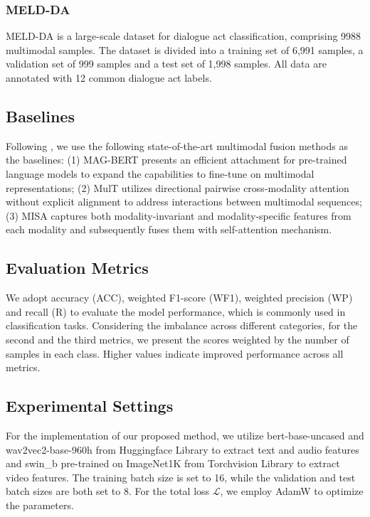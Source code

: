 \documentclass[letterpaper]{article} %
\begin{document}
\subsubsection{MELD-DA}
MELD-DA \cite{saha-etal-2020-towards} is a large-scale dataset for dialogue act classification, comprising 9988 multimodal samples. The dataset is divided into a training set of 6,991 samples, a validation set of 999 samples and a test set of 1,998 samples. All data are annotated with 12 common dialogue act labels.

\subsection{Baselines}
Following \cite{10.1145/3503161.3547906}, we use the following state-of-the-art multimodal fusion methods as the baselines: (1) MAG-BERT \cite{rahman2020integrating} presents an efficient attachment for pre-trained language models to expand the capabilities to fine-tune on multimodal representations; (2) MulT \cite{tsai2019multimodal} utilizes directional pairwise cross-modality attention without explicit alignment to address interactions between multimodal sequences; (3) MISA \cite{10.1145/3394171.3413678} captures both modality-invariant and modality-specific features from each modality and subsequently fuses them with self-attention mechanism.


\subsection{Evaluation Metrics}
We adopt accuracy (ACC), weighted F1-score (WF1), weighted precision (WP) and recall (R) to evaluate the model performance, which is commonly used in classification tasks. Considering the imbalance across different categories, for the second and the third metrics, we present the scores weighted by the number of samples in each class. Higher values indicate improved performance across all metrics.


\subsection{Experimental Settings}
For the implementation of our proposed method, we utilize bert-base-uncased and wav2vec2-base-960h from Huggingface Library \cite{wolf2019huggingface} to extract text and audio features and swin\_b pre-trained on ImageNet1K \cite{5206848} from Torchvision Library \cite{torchvision2016} to extract video features. The training batch size is set to 16, while the validation and test batch sizes are both set to 8. For the total loss $\mathcal{L}$, we employ AdamW \cite{loshchilov2017decoupled} to optimize the parameters.
\end{document}
